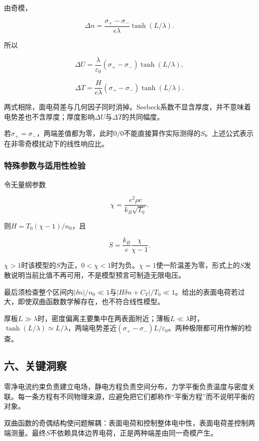 \documentclass[12pt,a4paper,fontset=fandol]{ctexart}
\begin{document}
由奇模，

\[
\Delta n=
\frac{\sigma_+-\sigma_-}{e\lambda}
\tanh(L/\lambda).
\]

所以

\[
\boxed{\Delta U=
\frac{\lambda}{\varepsilon_0}
(\sigma_+-\sigma_-)\tanh(L/\lambda)},
\]

\[
\boxed{\Delta T=
\frac{H}{e\lambda}
(\sigma_+-\sigma_-)\tanh(L/\lambda)}.
\]

两式相除，面电荷差与几何因子同时消掉。Seebeck系数不显含厚度，并不意味着电势差也不含厚度；厚度影响\(\Delta U\)与\(\Delta T\)的共同幅度。

若\(\sigma_+=\sigma_-\)，两端差值都为零，此时\(0/0\)不能直接算作实际测得的\(S\)。上述公式表示在非零奇模扰动下的线性响应比。

\subsubsection{特殊参数与适用性检验}\label{ux7279ux6b8aux53c2ux6570ux4e0eux9002ux7528ux6027ux68c0ux9a8c}

令无量纲参数

\[
\chi=\frac{e^2\rho c}{k_B\sqrt{T_0}}.
\]

则\(H=T_0(\chi-1)/n_0\)，且

\[
S=\frac{k_B}{e}\frac{\chi}{\chi-1}.
\]

\(\chi>1\)时该模型的\(S\)为正，\(0<\chi<1\)时为负。\(\chi=1\)使一阶温差为零，形式上的\(S\)发散说明当前比值不再可用，不是模型预言可制造无限电压。

最后须检查整个区间内\(|\delta n|/n_0\ll1\)与\(|H\delta n+C_T|/T_0\ll1\)。给出的表面电荷若过大，即使双曲函数数学解存在，也不符合线性模型。

厚板\(L\gg\lambda\)时，密度偏离主要集中在两表面附近；薄板\(L\ll\lambda\)时，\(\tanh(L/\lambda)\simeq L/\lambda\)，两端电势差近\((\sigma_+-\sigma_-)L/\varepsilon_0\)。两种极限都可用作解的检查。

\subsection{六、关键洞察}\label{ux516dux5173ux952eux6d1eux5bdf-5}

零净电流约束负责建立电场，静电方程负责空间分布，力学平衡负责温度与密度关联。每一条方程有不同物理来源，应避免把它们都称作``平衡方程''而不说明平衡的对象。

双曲函数的奇偶结构使问题解耦：表面电荷和控制整体电中性，表面电荷差控制两端测量。最终\(S\)不依赖具体边界电荷，正是两种端差由同一奇模产生。
\end{document}
